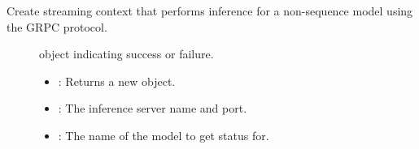 \documentclass[letterpaper,10pt,english]{sphinxmanual}
\begin{document}
\begin{fulllineitems}
\begin{fulllineitems}
\label{\detokenize{cpp_api/classnvidia_1_1inferenceserver_1_1client_1_1InferGrpcStreamContext:_CPPv4N6nvidia15inferenceserver6client22InferGrpcStreamContext6CreateEPNSt10unique_ptrI12InferContextEERKNSt6stringERKNSt6stringE7int64_tb}}%
\pysigstartmultiline
{}\label{\detokenize{cpp_api/classnvidia_1_1inferenceserver_1_1client_1_1InferGrpcStreamContext:classnvidia_1_1inferenceserver_1_1client_1_1InferGrpcStreamContext_1a6a356d8b5495f6ba471ed989712c8e64}}%
\pysigstopmultiline
Create streaming context that performs inference for a non-sequence model using the GRPC protocol. 

\begin{description}
\item[{}] \leavevmode
{\hyperref[\detokenize{cpp_api/classnvidia_1_1inferenceserver_1_1client_1_1Error:classnvidia_1_1inferenceserver_1_1client_1_1Error}]{}} object indicating success or failure. 

\item[{}] \leavevmode\begin{itemize}
\item {} 
: Returns a new {\hyperref[\detokenize{cpp_api/classnvidia_1_1inferenceserver_1_1client_1_1InferGrpcContext:classnvidia_1_1inferenceserver_1_1client_1_1InferGrpcContext}]{}} object. 

\item {} 
: The inference server name and port. 

\item {} 
: The name of the model to get status for. 


\end{itemize}
\end{description}
\end{fulllineitems}
\end{fulllineitems}
\end{document}
